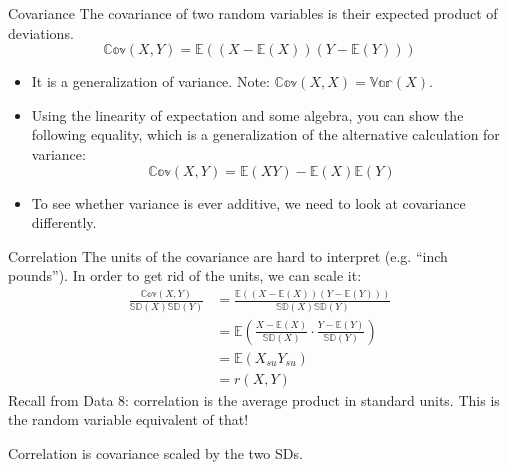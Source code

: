 \documentclass[aspectratio=169]{../latex_main/tntbeamer}  %
\begin{document}
	\begin{frame}[c]{Covariance}
	   The covariance of two random variables is their expected product of deviations.
	   \begin{equation*}
	       \mathbb{Cov}(X,Y) = \mathbb{E}((X-\mathbb{E}(X))(Y-\mathbb{E}(Y)))
	   \end{equation*}
	   \begin{itemize}
	       \item It is a generalization of variance. Note:   $\mathbb{Cov}(X,X) = \mathbb{Var}(X)$.   
	       \item Using the linearity of expectation and some algebra, you can show the following equality, which is a generalization of the alternative calculation for variance:
	       \begin{equation*}
	           \mathbb{Cov}(X,Y) = \mathbb{E}(XY) - \mathbb{E}(X)\mathbb{E}(Y)
	       \end{equation*}
	       \item To see whether variance is ever additive, we need to look at covariance differently.
	   \end{itemize}
	\end{frame}
	
	\begin{frame}[c]{Correlation}
	   The units of the covariance are hard to interpret (e.g. “inch pounds”). In order to get rid of the units, we can scale it:
	   \begin{align*}
	       \frac{\mathbb{Cov}(X,Y)}{\mathbb{SD}(X)\mathbb{SD}(Y)}  &= \frac{ \mathbb{E}((X-\mathbb{E}(X))(Y-\mathbb{E}(Y)))}{\mathbb{SD}(X)\mathbb{SD}(Y)}\\
	       &= \mathbb{E}\left( \frac{X-\mathbb{E}(X)}{\mathbb{SD}(X)} \cdot \frac{Y-\mathbb{E}(Y)}{\mathbb{SD}(Y)}\right)\\
	       &= \mathbb{E}(X_{su}Y_{su})\\
	       &= r(X,Y)
	   \end{align*}
	   Recall from Data 8: correlation is the average product in standard units. This is the random variable equivalent of that!

	   Correlation is covariance scaled by the two SDs.
	\end{frame}
	
\end{document}
